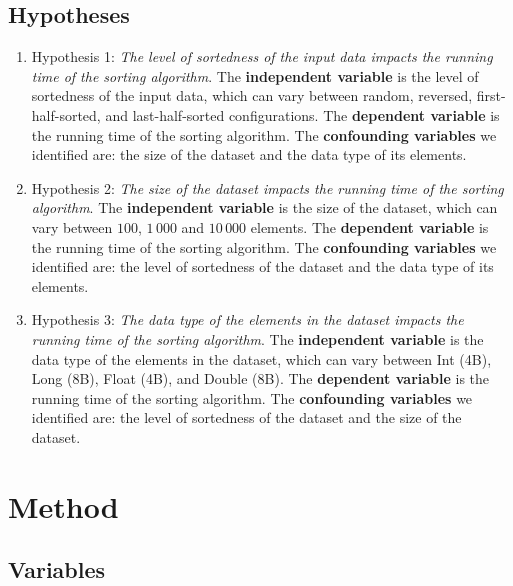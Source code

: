 \documentclass[unicode,11pt,a4paper,oneside,numbers=endperiod,openany]{scrartcl}
\begin{document}
    \subsection{Hypotheses}

    \begin{enumerate}
        \item Hypothesis 1: \textit{ The level of sortedness of the input data impacts the running time of the sorting algorithm}. The \textbf{independent variable} is the level of sortedness of the input data, which can vary between random, reversed, first-half-sorted, and last-half-sorted configurations. The \textbf{dependent variable} is the running time of the sorting algorithm. The \textbf{confounding variables} we identified are: the size of the dataset and the data type of its elements. 

        \item Hypothesis 2: \textit{The size of the dataset impacts the running time of the sorting algorithm}. The \textbf{independent variable} is the size of the dataset, which can vary between $100$, $1\,000$ and $10\,000$ elements. The \textbf{dependent variable} is the running time of the sorting algorithm. The \textbf{confounding variables} we identified are: the level of sortedness of the dataset and the data type of its elements. 

        \item Hypothesis 3: \textit{The data type of the elements in the dataset impacts the running time of the sorting algorithm}. The \textbf{independent variable} is the data type of the elements in the dataset, which can vary between Int (4B), Long (8B), Float (4B), and Double (8B). The \textbf{dependent variable} is the running time of the sorting algorithm. The \textbf{confounding variables} we identified are: the level of sortedness of the dataset and the size of the dataset.

    \end{enumerate}

\section{Method}

    \subsection{Variables}
\end{document}
